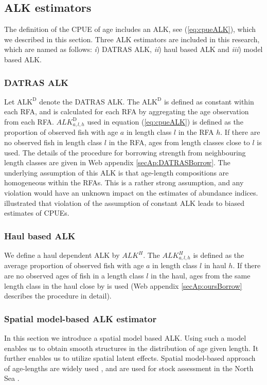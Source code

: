 \documentclass[a4paper 12pt]{article}
\numberwithin{equation}{section}
\begin{document}
\subsection{ALK estimators}
\label{sec:alkmethods}

The definition of the CPUE of age includes an ALK, see (\ref{eq:cpueALK}), which we described in this section. Three ALK estimators are included in this research, which are named as follows:  \textit{i}) DATRAS ALK, \textit{ii}) haul based ALK and \textit{iii}) model based ALK.
\subsubsection{DATRAS ALK}
\label{sec:datrasalkestimator}
Let $\text{ALK}^{\text{D}}$ denote the DATRAS ALK. The $\text{ALK}^{\text{D}}$ is defined as constant within each RFA, and is calculated for each RFA by aggregating the age observation from each RFA. $ALK^{\text{D}}_{a,l,h}$ used in equation (\ref{eq:cpueALK}) is defined as the proportion of observed fish with age $a$ in length class $l$ in the RFA $h$. If there are no observed fish in length class $l$ in the RFA, ages from length classes close to $l$ is used. The details of the procedure for borrowing strength from neighbouring length classes are given in Web appendix \ref{secAp:DATRASBorrow}. The underlying assumption of this ALK  is that age-length compositions are homogeneous within the RFAs. This is a rather strong assumption, and any violation would have an unknown impact on the estimates of abundance indices. \citet{aanes2015efficient} illustrated that violation of the assumption of constant ALK leads to biased estimates of CPUEs. 

\subsubsection{Haul based ALK}
\label{sec:haulestimator}
We define a haul dependent ALK  by  $ALK^{H}$. The $ALK^{H}_{a,l,h}$ is defined as the average proportion of observed fish with age $a$ in  length class $l$ in haul $h$. If there are no observed ages of fish in a length class $l$ in the haul, ages from the same length class in the haul close by is used (Web appendix \ref{secAp:oursBorrow} describes the procedure in detail).

\subsubsection{Spatial model-based ALK estimator}
\label{sec:spatialModelALK}
In this section we introduce a spatial model based ALK. Using such a model enables us to obtain smooth structures in the distribution of age given length. It further enables us to utilize spatial latent effects. Spatial model-based approach of age-lengths are widely used \citep{berg2012spatial, hirst2012bayesian, rindorf2001analyses}, and are used for stock assessment in the North Sea \citep{berg2014evaluation}.  %
\end{document}

